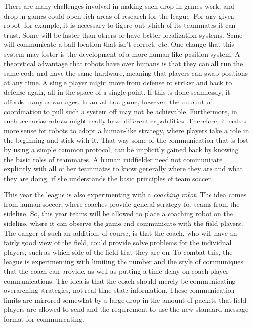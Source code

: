 \documentclass{llncs}
\begin{document}
There are many challenges involved in making such drop-in games work, and drop-in games
could open rich areas of research for the league.
For any given robot, for example, it is necessary to figure out which
of its teammates it can trust. Some will be faster than others or have
better localization systems. Some will communicate a ball location
that isn't correct, etc. One change that this system may foster is
the development of a more human-like position system. A theoretical advantage that robots
have over humans is that they can all run the same code and have
the same hardware, meaning that players can swap positions at any
time. A single player might move from defense to striker and back to
defense again, all in the space of a single point. If this is done seamlessly,
it affords many advantages. In an ad hoc game, however, the amount of
coordination to pull such a system off may not be achievable. 
Furthermore, in such scenarios robots might really have different capabilities.
Therefore, it makes
more sense for robots to adopt a human-like strategy, where
players take a role in the beginning and stick with it. That way some of the
communication that is lost by using a simple common protocol, can
be implicitly gained back by knowing the basic roles of teammates.
A human midfielder need not communicate explicitly with all of her
teammates to know generally where they are and what they are doing,
if she understands the basic principles of team soccer.

This year the league is also experimenting with a \textit{coaching robot}. The
idea comes from human soccer, where coaches provide general strategy
for teams from the sideline. So, this year teams will be allowed to place
a coaching robot on the sideline, where it can observe the game and communicate with the field players. The
danger of such an addition, of course, is that the coach, who will have an
fairly good view of the field, could provide solve
problems for the individual players, such as which side of the field
that they are on. To combat this, the league is experimenting with limiting
the number and the style of communiques that the coach can provide, 
as well as putting a time delay on coach-player communications.
The idea is that the coach should merely be communicating overarching
strategies, not real-time state information. 
These communication limits are mirrored somewhat by a large drop in
the amount of packets that field players are allowed to send
and the requirement to use the new standard message format for communicating.
\end{document}
